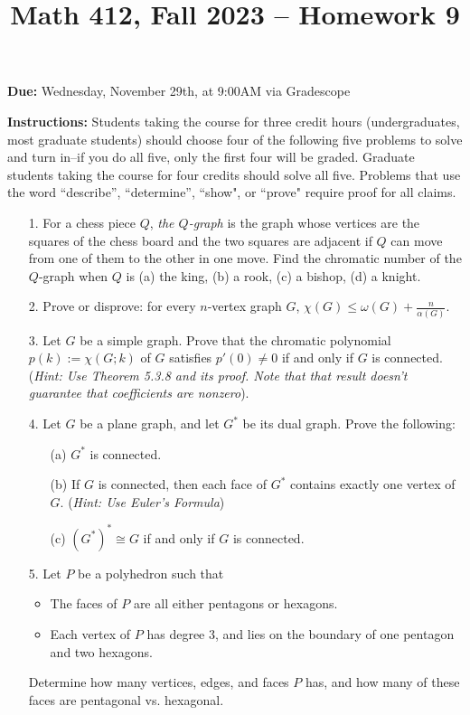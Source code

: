 \documentclass[12pt]{article}
\title{Math 412, Fall 2023 -- Homework 9}
\date{}
\begin{document}
 \maketitle
\vspace{-80pt}

\textbf{Due:} Wednesday, November 29th, at 9:00AM via Gradescope

\textbf{Instructions:} Students taking the course for three credit hours (undergraduates, most graduate
students) should choose four of the following five problems to solve and turn in--if you do all five, only the first four will be graded. Graduate students
taking the course for four credits should solve all five. Problems that use the word ``describe”,
``determine”, ``show", or ``prove" require proof for all claims.

\begin{enumerate}

\item[1.] For a chess piece $Q$, {\em the $Q$-graph} is the graph whose vertices are the squares of the chess board
and the two squares are adjacent if $Q$ can move from one of them to the other in one move. Find the chromatic
number of the $Q$-graph when $Q$ is  (a) the king, (b) a rook, (c) a bishop, (d) a knight.


\item[2.] Prove or disprove: for every $n$-vertex graph $G$,  $\chi(G)\leq \omega(G)+\frac{n}{\alpha(G)}$.


\item[3.] Let $G$ be a simple graph. Prove that the chromatic polynomial $p(k) := \chi(G;k)$ of $G$ satisfies $p'(0)\ne 0$ if and only if $G$ is connected. (\emph{Hint: Use Theorem 5.3.8 and its proof. Note that that result doesn't guarantee that coefficients are nonzero}).

\item[4.] Let $G$ be a plane graph, and let $G^*$ be its dual graph. Prove the following:
\begin{enumerate}
    \item[(a)] $G^*$ is connected.
    
    \item[(b)] If $G$ is connected, then each face of $G^*$ contains exactly one vertex of $G$. (\emph{Hint: Use Euler's Formula})
    
    \item[(c)] $(G^*)^*\cong G$ if and only if $G$ is connected.
\end{enumerate}


\item[5.] Let $P$ be a polyhedron such that
\begin{itemize}
    \item The faces of $P$ are all either pentagons or hexagons.
    \item Each vertex of $P$ has degree 3, and lies on the boundary of one pentagon and two hexagons.
\end{itemize}

Determine how many vertices, edges, and faces $P$ has, and how many of these faces are pentagonal vs. hexagonal.





\end{enumerate}
\end{document}
